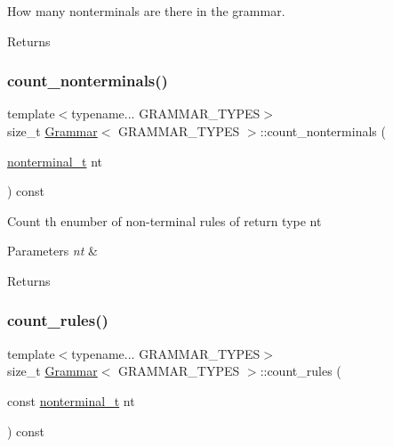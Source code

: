 How many nonterminals are there in the grammar. \begin{DoxyReturn}{Returns}

\end{DoxyReturn}
\mbox{\label{class_grammar_a335c2679b0db2290a1a0da8910f0bcdd}} 
\subsubsection{\texorpdfstring{count\+\_\+nonterminals()}{count\_nonterminals()}\hspace{0.1cm}{\footnotesize\ttfamily [2/2]}}
{\footnotesize\ttfamily template$<$typename... G\+R\+A\+M\+M\+A\+R\+\_\+\+T\+Y\+P\+ES$>$ \\
size\+\_\+t \hyperlink{class_grammar}{Grammar}$<$ G\+R\+A\+M\+M\+A\+R\+\_\+\+T\+Y\+P\+ES $>$\+::count\+\_\+nonterminals (\begin{DoxyParamCaption}\item[{\hyperlink{_nonterminal_8h_a5c1f658dc7560600a16d22408bd716ca}{nonterminal\+\_\+t}}]{nt }\end{DoxyParamCaption}) const\hspace{0.3cm}{\ttfamily [inline]}}

Count th enumber of non-\/terminal rules of return type nt 
\begin{DoxyParams}{Parameters}
{\em nt} & \\
\hline
\end{DoxyParams}
\begin{DoxyReturn}{Returns}

\end{DoxyReturn}
\mbox{\label{class_grammar_a90a765c97b89f2f4cf12b6b4c2a3d019}} 
\subsubsection{\texorpdfstring{count\+\_\+rules()}{count\_rules()}\hspace{0.1cm}{\footnotesize\ttfamily [1/2]}}
{\footnotesize\ttfamily template$<$typename... G\+R\+A\+M\+M\+A\+R\+\_\+\+T\+Y\+P\+ES$>$ \\
size\+\_\+t \hyperlink{class_grammar}{Grammar}$<$ G\+R\+A\+M\+M\+A\+R\+\_\+\+T\+Y\+P\+ES $>$\+::count\+\_\+rules (\begin{DoxyParamCaption}\item[{const \hyperlink{_nonterminal_8h_a5c1f658dc7560600a16d22408bd716ca}{nonterminal\+\_\+t}}]{nt }\end{DoxyParamCaption}) const\hspace{0.3cm}{\ttfamily [inline]}}

